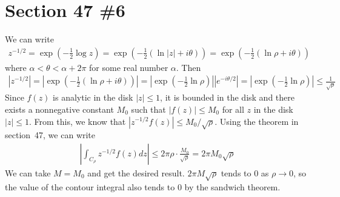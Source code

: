 \documentclass{scrartcl}
\begin{document}
\section{Section 47 \#6}
We can write
\begin{align*}
  z^{-1/2} = \exp \left( -\frac{1}{2} \log z \right) = \exp \left( -\frac{1}{2} (\ln |z| + i\theta) \right) = \exp \left( -\frac{1}{2} (\ln \rho + i\theta) \right)
\end{align*}
where \(\alpha < \theta < \alpha + 2\pi\) for some real number \(\alpha\).
Then
\begin{align*}
  |z^{-1/2}| = \left| \exp \left( -\frac{1}{2} (\ln \rho + i\theta) \right) \right| = \left| \exp \left( -\frac{1}{2}\ln \rho \right) \right| \left| e^{-i\theta / 2} \right| = \left| \exp \left( -\frac{1}{2} \ln \rho \right) \right| \leq \frac{1}{\sqrt{\rho}}
\end{align*}
Since \(f(z)\) is analytic in the disk \(|z| \leq 1\), it is bounded in the disk and there exists a nonnegative constant \(M_0\) such that \(|f(z)| \leq M_0\) for all \(z\) in the disk \(|z| \leq 1\).
From this, we know that \(|z^{-1/2} f(z)| \leq M_0 / \sqrt{\rho}\).
Using the theorem in section~47, we can write
\begin{align*}
  \left| \int_{C_\rho} z^{-1/2} f(z) dz \right| \leq 2\pi\rho \cdot \frac{M_0}{\sqrt{\rho}} = 2\pi M_0 \sqrt{\rho}
\end{align*}
We can take \(M = M_0\) and get the desired result.
\(2\pi M \sqrt{\rho}\) tends to 0 as \(\rho \to 0\), so the value of the contour integral also tends to 0 by the sandwich theorem.
\end{document}
